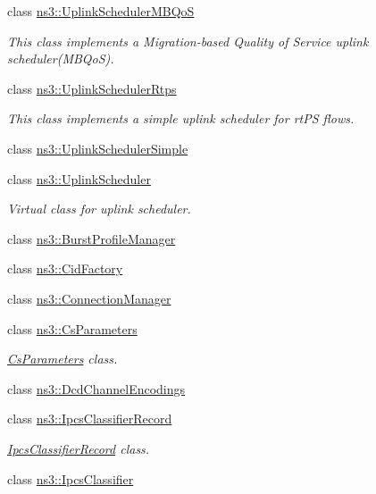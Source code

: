 \begin{DoxyCompactItemize}
class \hyperlink{classns3_1_1UplinkSchedulerMBQoS}{ns3\+::\+Uplink\+Scheduler\+M\+B\+QoS}
\begin{DoxyCompactList}\small\item\em This class implements a Migration-\/based Quality of Service uplink scheduler(\+M\+B\+Qo\+S). \end{DoxyCompactList}\item 
class \hyperlink{classns3_1_1UplinkSchedulerRtps}{ns3\+::\+Uplink\+Scheduler\+Rtps}
\begin{DoxyCompactList}\small\item\em This class implements a simple uplink scheduler for rt\+PS flows. \end{DoxyCompactList}\item 
class \hyperlink{classns3_1_1UplinkSchedulerSimple}{ns3\+::\+Uplink\+Scheduler\+Simple}
\item 
class \hyperlink{classns3_1_1UplinkScheduler}{ns3\+::\+Uplink\+Scheduler}
\begin{DoxyCompactList}\small\item\em Virtual class for uplink scheduler. \end{DoxyCompactList}\item 
class \hyperlink{classns3_1_1BurstProfileManager}{ns3\+::\+Burst\+Profile\+Manager}
\item 
class \hyperlink{classns3_1_1CidFactory}{ns3\+::\+Cid\+Factory}
\item 
class \hyperlink{classns3_1_1ConnectionManager}{ns3\+::\+Connection\+Manager}
\item 
class \hyperlink{classns3_1_1CsParameters}{ns3\+::\+Cs\+Parameters}
\begin{DoxyCompactList}\small\item\em \hyperlink{classns3_1_1CsParameters}{Cs\+Parameters} class. \end{DoxyCompactList}\item 
class \hyperlink{classns3_1_1DcdChannelEncodings}{ns3\+::\+Dcd\+Channel\+Encodings}
\item 
class \hyperlink{classns3_1_1IpcsClassifierRecord}{ns3\+::\+Ipcs\+Classifier\+Record}
\begin{DoxyCompactList}\small\item\em \hyperlink{classns3_1_1IpcsClassifierRecord}{Ipcs\+Classifier\+Record} class. \end{DoxyCompactList}\item 
class \hyperlink{classns3_1_1IpcsClassifier}{ns3\+::\+Ipcs\+Classifier}
\item 

\end{DoxyCompactItemize}
